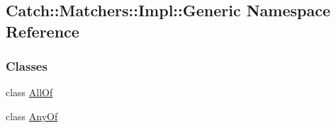 \hypertarget{a00123}{}\subsection{Catch\+:\+:Matchers\+:\+:Impl\+:\+:Generic Namespace Reference}
\label{a00123}
\subsubsection*{Classes}
\begin{DoxyCompactItemize}
\item 
class \hyperlink{a00001}{All\+Of}
\item 
class \hyperlink{a00002}{Any\+Of}
\end{DoxyCompactItemize}
